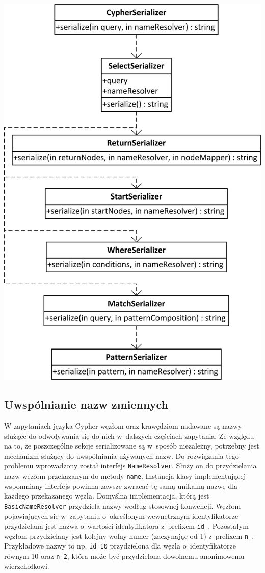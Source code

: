 \documentclass{xmgr}
\begin{document}
\newpage

\begin{center}
	\includegraphics[scale=1]{images/cypher-serialization-uml.png}
\end{center}

\subsection{Uwspólnianie nazw zmiennych}

W zapytaniach języka Cypher węzłom oraz krawędziom nadawane są nazwy służące do odwoływania się do nich w~dalszych częściach zapytania. Ze względu na to, że poszczególne sekcje serializowane są w~sposób niezależny, potrzebny jest mechanizm służący do uwspólniania używanych nazw. Do rozwiązania tego problemu wprowadzony został interfejs \texttt{NameResolver}. Służy on do przydzielania nazw węzłom przekazanym do metody \texttt{name}. Instancja klasy implementującej wspomniany interfejs powinna zawsze zwracać tę samą unikalną nazwę dla każdego przekazanego węzła. Domyślna implementacja, którą jest \texttt{BasicNameResolver} przydziela nazwy według stosownej konwencji. Węzłom pojawiających się w~zapytaniu o~określonym wewnętrznym identyfikatorze przydzielana jest nazwa o~wartości identyfikatora z~prefixem \texttt{id\_}. Pozostałym węzłom przydzielany jest kolejny wolny numer (zaczynając od 1) z~prefixem \texttt{n\_}. Przykładowe nazwy to np. \texttt{id\_10} przydzielona dla węzła o~identyfikatorze równym 10 oraz \texttt{n\_2}, która może być przydzielona dowolnemu anonimowemu wierzchołkowi.
\end{document}
